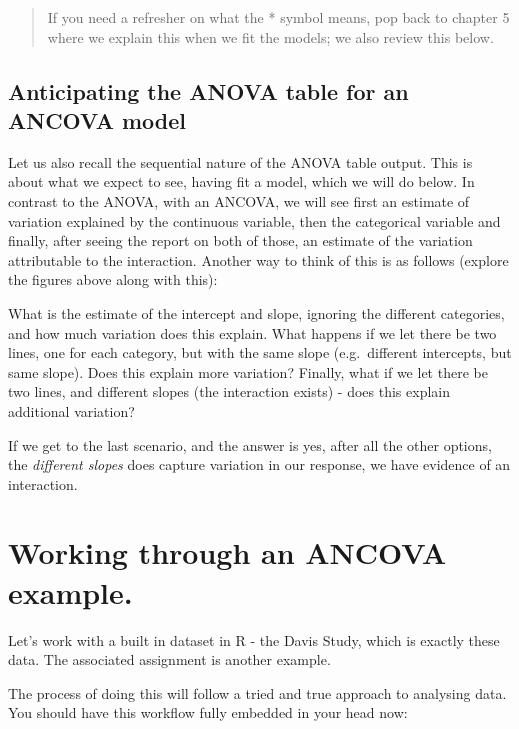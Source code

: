\documentclass[
]{book}
\begin{document}
\begin{quote}
If you need a refresher on what the * symbol means, pop back to chapter 5 where we explain this when we fit the models; we also review this below.
\end{quote}

\hypertarget{anticipating-the-anova-table-for-an-ancova-model}{%
\subsection{Anticipating the ANOVA table for an ANCOVA model}\label{anticipating-the-anova-table-for-an-ancova-model}}

Let us also recall the sequential nature of the ANOVA table output. This is about what we expect to see, having fit a model, which we will do below. In contrast to the ANOVA, with an ANCOVA, we will see first an estimate of variation explained by the continuous variable, then the categorical variable and finally, after seeing the report on both of those, an estimate of the variation attributable to the interaction. Another way to think of this is as follows (explore the figures above along with this):

What is the estimate of the intercept and slope, ignoring the different categories, and how much variation does this explain.
What happens if we let there be two lines, one for each category, but with the same slope (e.g.~different intercepts, but same slope). Does this explain more variation?
Finally, what if we let there be two lines, and different slopes (the interaction exists) - does this explain additional variation?

If we get to the last scenario, and the answer is yes, after all the other options, the \emph{different slopes} does capture variation in our response, we have evidence of an interaction.

\hypertarget{working-through-an-ancova-example.}{%
\section{Working through an ANCOVA example.}\label{working-through-an-ancova-example.}}

Let's work with a built in dataset in R - the Davis Study, which is exactly these data. The associated assignment is another example.

The process of doing this will follow a tried and true approach to analysing data. You should have this workflow fully embedded in your head now:
\end{document}
